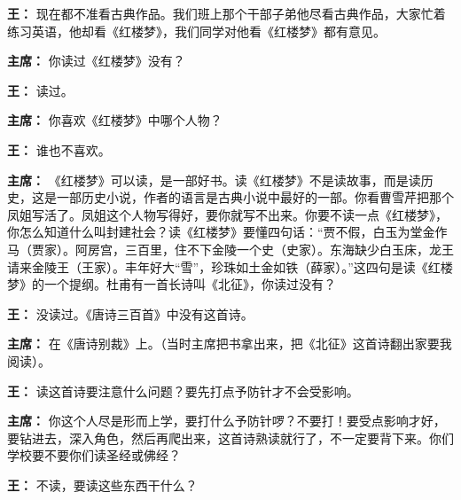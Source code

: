 \begin{list}{}{
    \setlength{\topsep}{0pt}        %
    \setlength{\partopsep}{0pt}     %
    \setlength{\parsep}{\parskip}   %
    \setlength{\itemsep}{\lineskip}       %
    \setlength{\labelsep}{0pt}%
    \setlength{\labelwidth}{3em}%
    \setlength{\itemindent}{0pt}%
    \setlength\listparindent{\parindent}
    \setlength{\leftmargin}{3em}
    \setlength{\rightmargin}{0pt}
    }

\item[\textbf{王：}] 现在都不准看古典作品。我们班上那个干部子弟他尽看古典作品，大家忙着练习英语，他却看《红楼梦》，我们同学对他看《红楼梦》都有意见。

\item[\textbf{主席：}] 你读过《红楼梦》没有？

\item[\textbf{王：}] 读过。

\item[\textbf{主席：}] 你喜欢《红楼梦》中哪个人物？

\item[\textbf{王：}] 谁也不喜欢。

\item[\textbf{主席：}] 《红楼梦》可以读，是一部好书。读《红楼梦》不是读故事，而是读历史，这是一部历史小说，作者的语言是古典小说中最好的一部。你看曹雪芹把那个凤姐写活了。凤姐这个人物写得好，要你就写不出来。你要不读一点《红楼梦》，你怎么知道什么叫封建社会？读《红楼梦》要懂四句话：“贾不假，白玉为堂金作马（贾家）。阿房宫，三百里，住不下金陵一个史（史家）。东海缺少白玉床，龙王请来金陵王（王家）。丰年好大“雪”，珍珠如土金如铁（薛家）。”这四句是读《红楼梦》的一个提纲。杜甫有一首长诗叫《北征》，你读过没有？

\item[\textbf{王：}] 没读过。《唐诗三百首》中没有这首诗。

\item[\textbf{主席：}] 在《唐诗别裁》上。（当时主席把书拿出来，把《北征》这首诗翻出家要我阅读）。

\item[\textbf{王：}] 读这首诗要注意什么问题？要先打点予防针才不会受影响。

\item[\textbf{主席：}] 你这个人尽是形而上学，要打什么予防针啰？不要打！要受点影响才好，要钻进去，深入角色，然后再爬出来，这首诗熟读就行了，不一定要背下来。你们学校要不要你们读圣经或佛经？

\item[\textbf{王：}] 不读，要读这些东西干什么？


\end{list}
